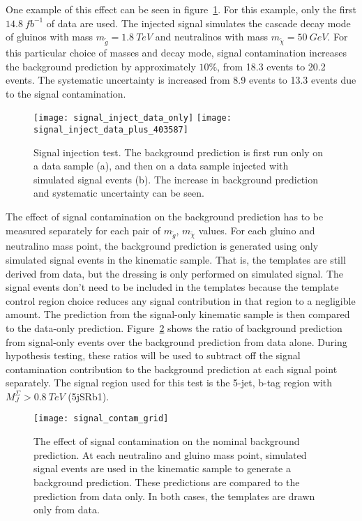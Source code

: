 One example of this effect can be seen in figure~\ref{fig:signal_inject_403587}.
For this example, only the first $14.8~fb^{-1}$ of data are used.
The injected signal simulates the cascade decay mode of gluinos with mass $m_{\tilde{g}}=1.8~TeV$ and neutralinos with mass $m_{\tilde{\chi}}=50~GeV$.
For this particular choice of masses and decay mode, signal contamination increases the background prediction by approximately $10\%$, from 18.3 events to 20.2 events.
The systematic uncertainty is increased from 8.9 events to 13.3 events due to the signal contamination.

\begin{figure}[!ht]
    \centering
    \texttt{[image: signal\_inject\_data\_only]}
    \texttt{[image: signal\_inject\_data\_plus\_403587]}
    \caption{Signal injection test.
    The background prediction is first run only on a data sample (a), and then on a data sample injected with simulated signal events (b).
    The increase in background prediction and systematic uncertainty can be seen.}
    \label{fig:signal_inject_403587}
\end{figure}

The effect of signal contamination on the background prediction has to be measured separately for each pair of $m_{\tilde{g}}$, $m_{\tilde{\chi}}$ values.
For each gluino and neutralino mass point, the background prediction is generated using only simulated signal events in the kinematic sample.
That is, the templates are still derived from data, but the dressing is only performed on simulated signal.
The signal events don't need to be included in the templates because the template control region choice reduces any signal contribution in that region to a negligible amount.
The prediction from the signal-only kinematic sample is then compared to the data-only prediction.
Figure~\ref{fig:signal_contam_grid} shows the ratio of background prediction from signal-only events over the background prediction from data alone.
During hypothesis testing, these ratios will be used to subtract off the signal contamination contribution to the background prediction at each signal point separately.
The signal region used for this test is the 5-jet, b-tag region with $M_J^{\Sigma}>0.8~TeV$ (5jSRb1).

\begin{figure}[!ht]
    \centering
    \texttt{[image: signal\_contam\_grid]}
    \caption{The effect of signal contamination on the nominal background prediction.
    At each neutralino and gluino mass point, simulated signal events are used in the kinematic sample to generate a background prediction.
    These predictions are compared to the prediction from data only.
    In both cases, the templates are drawn only from data.}
    \label{fig:signal_contam_grid}
\end{figure}


